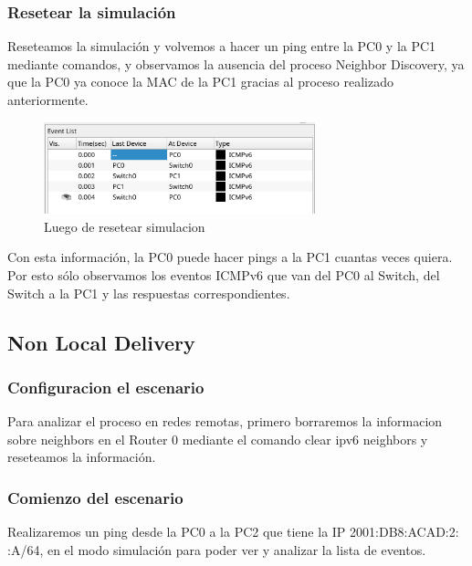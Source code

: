 \documentclass[a4paper,12pt]{article}
\begin{document}
\bigskip

\subsubsection{Resetear la simulación}

Reseteamos la simulación y volvemos a hacer un ping entre la PC0 y la PC1 mediante comandos, y observamos la ausencia del proceso Neighbor Discovery, ya que la PC0 ya conoce la MAC de la PC1 gracias al proceso realizado anteriormente.

\bigskip
\begin{figure}[h]
  \centering
  \includegraphics[width=0.7\textwidth]{imagenes/LD3.png}
  \caption{Luego de resetear simulacion}
\end{figure}
\FloatBarrier

Con esta información, la PC0 puede hacer pings a la PC1 cuantas veces quiera. Por esto sólo observamos los eventos ICMPv6 que van del PC0 al Switch, del Switch a la PC1 y las respuestas correspondientes. 

\bigskip

\subsection{Non Local Delivery}

\subsubsection{Configuracion el escenario}
Para analizar el proceso en redes remotas, primero borraremos la informacion sobre neighbors en el Router 0 mediante el comando clear ipv6 neighbors y reseteamos la información.\\

\subsubsection{Comienzo del escenario}
Realizaremos un ping desde la PC0 a la PC2 que tiene la IP 2001:DB8:ACAD:2: :A/64, en el modo simulación para poder ver y analizar la lista de eventos.\\
\end{document}
